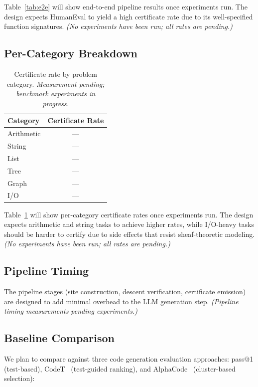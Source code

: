 \documentclass[11pt]{article}
\begin{document}
Table~\ref{tab:e2e} will show end-to-end pipeline results once experiments run.
The design expects HumanEval to yield a high certificate rate
due to its well-specified function signatures.
\emph{(No experiments have been run; all rates are pending.)}

\subsection{Per-Category Breakdown}

\begin{table}[t]
\centering
\caption{Certificate rate by problem category.
  \emph{Measurement pending; benchmark experiments in progress.}}\label{tab:categories}
\begin{tabular}{lc}
\toprule
\textbf{Category} & \textbf{Certificate Rate} \\
\midrule
Arithmetic    & --- \\
String        & --- \\
List          & --- \\
Tree          & --- \\
Graph         & --- \\
I/O           & --- \\
\bottomrule
\end{tabular}
\end{table}

Table~\ref{tab:categories} will show per-category certificate rates once experiments run.
The design expects arithmetic and string tasks to achieve higher rates, while I/O-heavy tasks
should be harder to certify due to side effects that
resist sheaf-theoretic modeling.
\emph{(No experiments have been run; all rates are pending.)}

\subsection{Pipeline Timing}

The \JuGeo{} pipeline stages (site construction, descent verification, certificate
emission) are designed to add minimal overhead to the LLM generation step.
\emph{(Pipeline timing measurements pending experiments.)}

\subsection{Baseline Comparison}

We plan to compare against three code generation evaluation approaches:
pass@1 (test-based), CodeT~\cite{Chen2023codeT} (test-guided ranking),
and AlphaCode~\cite{Li2022alphacode} (cluster-based selection):
\end{document}
